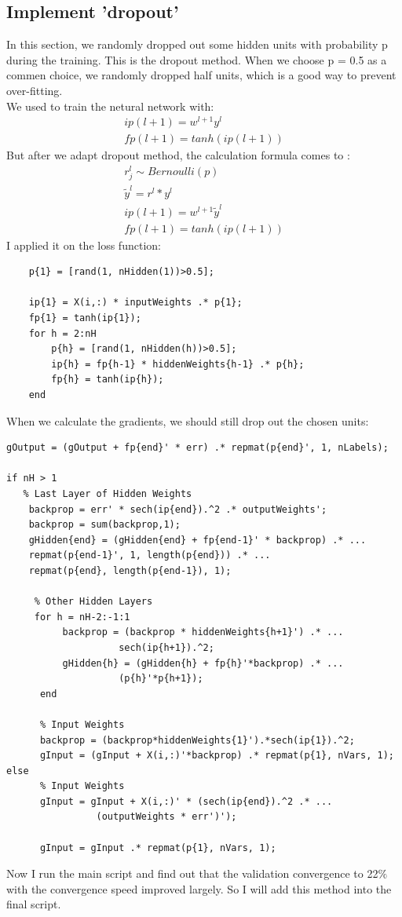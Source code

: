 \documentclass[12pt]{article}
\begin{document}
\subsection{Implement 'dropout'}
In this section, we randomly dropped out some hidden units with probability p during the training. This is the dropout method. When we choose p = 0.5 as a commen choice, we randomly dropped half units, which is a good way to prevent over-fitting.\\
We used to train the netural network with:
\begin{align*}
ip(l+1) = w^{l+1}y^l\\
fp(l+1) = tanh(ip(l+1))
\end{align*}
But after we adapt dropout method, the calculation formula comes to :
\begin{align*}
r_j^l \sim Bernoulli(p)\\
\tilde y^l = r^l * y^l\\
ip(l+1) = w^{l+1}\tilde y^l\\
fp(l+1) = tanh(ip(l+1))
\end{align*}
I applied it on the loss function:
\begin{lstlisting}
    p{1} = [rand(1, nHidden(1))>0.5];
   
    ip{1} = X(i,:) * inputWeights .* p{1};
    fp{1} = tanh(ip{1});
    for h = 2:nH
        p{h} = [rand(1, nHidden(h))>0.5];
        ip{h} = fp{h-1} * hiddenWeights{h-1} .* p{h};
        fp{h} = tanh(ip{h});
    end
\end{lstlisting}
When we calculate the gradients, we should still drop out the chosen units:
\begin{lstlisting}
gOutput = (gOutput + fp{end}' * err) .* repmat(p{end}', 1, nLabels);
        
if nH > 1
   % Last Layer of Hidden Weights
    backprop = err' * sech(ip{end}).^2 .* outputWeights';
    backprop = sum(backprop,1);
    gHidden{end} = (gHidden{end} + fp{end-1}' * backprop) .* ...
    repmat(p{end-1}', 1, length(p{end})) .* ...
    repmat(p{end}, length(p{end-1}), 1);
            
     % Other Hidden Layers
     for h = nH-2:-1:1
          backprop = (backprop * hiddenWeights{h+1}') .* ...
                    sech(ip{h+1}).^2;
          gHidden{h} = (gHidden{h} + fp{h}'*backprop) .* ...
                    (p{h}'*p{h+1});
      end
            
      % Input Weights
      backprop = (backprop*hiddenWeights{1}').*sech(ip{1}).^2;
      gInput = (gInput + X(i,:)'*backprop) .* repmat(p{1}, nVars, 1);
else
      % Input Weights
      gInput = gInput + X(i,:)' * (sech(ip{end}).^2 .* ...
                (outputWeights * err')');
           
      gInput = gInput .* repmat(p{1}, nVars, 1);
\end{lstlisting}
Now I run the main script and find out that the validation convergence to 22$\%$ with the convergence speed improved largely. So I will add this method into the final script.
\end{document}
